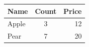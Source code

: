 \documentclass{article}
\begin{document}
\begin{tabular}{lcr}
\toprule
Name & Count & Price \\
\midrule
Apple & 3 & 12 \\
Pear & 7 & 20 \\
\bottomrule
\end{tabular}
\end{document}
